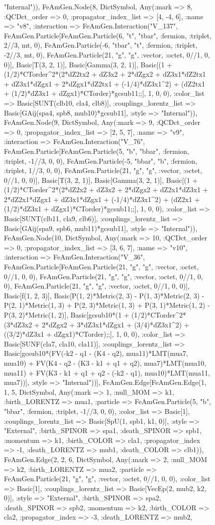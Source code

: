 \documentclass{revtex4}
\begin{document}
\begin{figure}[!htb]
\begin{center}
{"Internal")), FeAmGen.Node(8, Dict{Symbol, Any}(:mark => 8, :QCDct_order => 0, :propagator_index_list => [4, -4, 6], :name => "v8", :interaction => FeAmGen.Interaction("V_137", FeAmGen.Particle[FeAmGen.Particle(6, "t", "tbar", :fermion, :triplet, 2//3, mt, 0), FeAmGen.Particle(-6, "tbar", "t", :fermion, :triplet, -2//3, mt, 0), FeAmGen.Particle(21, "g", "g", :vector, :octet, 0//1, 0, 0)], Basic[T(3, 2, 1)], Basic[Gamma(3, 2, 1)], Basic[(1 + (1/2)*CTorder^2*(2*dZ2tx2 + dZ3x2 + 2*dZgx2 + dZ3x1*dZ2tx1 + dZ3x1*dZgx1 + 2*dZgx1*dZ2tx1 + (-1/4)*dZ3x1^2) + (dZ2tx1 + (1/2)*dZ3x1 + dZgx1)*CTorder)*gcsub11;;], 1, 0, 0), :color_list => Basic[SUNT(clb10, cla4, clb8)], :couplings_lorentz_list => Basic[GAij(spa4, spb8, mub10)*gcsub11], :style => "Internal")), FeAmGen.Node(9, Dict{Symbol, Any}(:mark => 9, :QCDct_order => 0, :propagator_index_list => [2, 5, 7], :name => "v9", :interaction => FeAmGen.Interaction("V_76", FeAmGen.Particle[FeAmGen.Particle(5, "b", "bbar", :fermion, :triplet, -1//3, 0, 0), FeAmGen.Particle(-5, "bbar", "b", :fermion, :triplet, 1//3, 0, 0), FeAmGen.Particle(21, "g", "g", :vector, :octet, 0//1, 0, 0)], Basic[T(3, 2, 1)], Basic[Gamma(3, 2, 1)], Basic[(1 + (1/2)*CTorder^2*(2*dZ2x2 + dZ3x2 + 2*dZgx2 + dZ2x1*dZ3x1 + 2*dZ2x1*dZgx1 + dZ3x1*dZgx1 + (-1/4)*dZ3x1^2) + (dZ2x1 + (1/2)*dZ3x1 + dZgx1)*CTorder)*gcsub11;;], 1, 0, 0), :color_list => Basic[SUNT(clb11, cla9, clb6)], :couplings_lorentz_list => Basic[GAij(spa9, spb6, mub11)*gcsub11], :style => "Internal")), FeAmGen.Node(10, Dict{Symbol, Any}(:mark => 10, :QCDct_order => 0, :propagator_index_list => [3, 6, 7], :name => "v10", :interaction => FeAmGen.Interaction("V_36", FeAmGen.Particle[FeAmGen.Particle(21, "g", "g", :vector, :octet, 0//1, 0, 0), FeAmGen.Particle(21, "g", "g", :vector, :octet, 0//1, 0, 0), FeAmGen.Particle(21, "g", "g", :vector, :octet, 0//1, 0, 0)], Basic[f(1, 2, 3)], Basic[P(1, 2)*Metric(2, 3) - P(1, 3)*Metric(2, 3) - P(2, 1)*Metric(1, 3) + P(2, 3)*Metric(1, 3) + P(3, 1)*Metric(1, 2) - P(3, 2)*Metric(1, 2)], Basic[gcsub10*(1 + (1/2)*CTorder^2*(3*dZ3x2 + 2*dZgx2 + 3*dZ3x1*dZgx1 + (3/4)*dZ3x1^2) + ((3/2)*dZ3x1 + dZgx1)*CTorder);;], 1, 0, 0), :color_list => Basic[SUNF(cla7, cla10, cla11)], :couplings_lorentz_list => Basic[gcsub10*(FV(-k2 - q1 - (K4 - q2), mua11)*LMT(mua7, mua10) + FV(K4 - q2 - (K3 - k1 + q1 + q2), mua7)*LMT(mua10, mua11) + FV(K3 - k1 + q1 + q2 - (-k2 - q1), mua10)*LMT(mua11, mua7))], :style => "Internal"))], FeAmGen.Edge[FeAmGen.Edge(1, 1, 5, Dict{Symbol, Any}(:mark => 1, :null_MOM => k1, :birth_LORENTZ => mua1, :particle => FeAmGen.Particle(5, "b", "bbar", :fermion, :triplet, -1//3, 0, 0), :color_list => Basic[1], :couplings_lorentz_list => Basic[SpU(1, spb1, k1, 0)], :style => "External", :birth_SPINOR => spa1, :death_SPINOR => spb1, :momentum => k1, :birth_COLOR => cla1, :propagator_index => -1, :death_LORENTZ => mub1, :death_COLOR => clb1)), FeAmGen.Edge(2, 2, 6, Dict{Symbol, Any}(:mark => 2, :null_MOM => k2, :birth_LORENTZ => mua2, :particle => FeAmGen.Particle(21, "g", "g", :vector, :octet, 0//1, 0, 0), :color_list => Basic[1], :couplings_lorentz_list => Basic[VecEp(2, mub2, k2, 0)], :style => "External", :birth_SPINOR => spa2, :death_SPINOR => spb2, :momentum => k2, :birth_COLOR => cla2, :propagator_index => -3, :death_LORENTZ => mub2, }
\end{center}
\end{figure}
\end{document}
